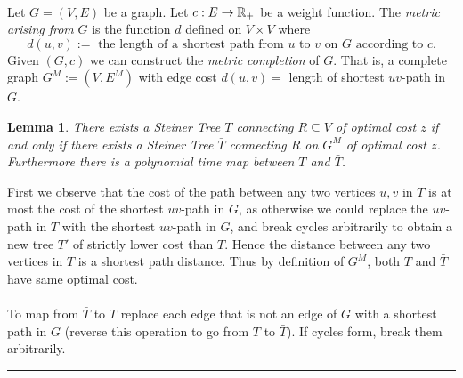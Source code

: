 \documentclass[letterpaper,12pt,oneside,onecolumn]{article}
\newenvironment{proof}{{\bf Proof:  }}{\hfill\rule{2mm}{2mm}}
\newtheorem{lemma}[fact]{Lemma}
\begin{document}
\paragraph{}
Let $G=(V,E)$ be a graph. Let $c : E \rightarrow \mathbb{R}_+$ be a weight function. The {\it metric arising from} $G$ is the function $d$ defined on $V \times V$ where
$$d(u,v) := \text{ the length of a shortest path from } u \text{ to } v \text{ on } G \text{ according to } c.$$ Given $(G,c)$ we can construct the {\it metric completion} of $G$. That is, a complete graph $G^M := (V, E^M)$ with edge cost $d(u,v)  = $ length of shortest $uv$-path in $G$.
\begin{lemma}
There exists a Steiner Tree $T$ connecting $R\subseteq V$ of optimal cost $z$ if and only if there exists a Steiner Tree $\bar{T}$ connecting $R$ on $G^M$ of optimal cost $z$. Furthermore there is a polynomial time map between $T$ and $\bar{T}$.
\end{lemma}
\begin{proof}
First we observe that the cost of the path between any two vertices $u,v$ in $T$ is at most the cost of the shortest $uv$-path in $G$, as otherwise we could replace the $uv$-path in $T$ with the shortest $uv$-path in $G$, and break cycles arbitrarily to obtain a new tree $T'$ of strictly lower cost than $T$. Hence the distance between any two vertices in $T$ is a shortest path distance. Thus by definition of $G^M$, both $T$ and $\bar{T}$ have same optimal cost.
\paragraph{}
To map from $\bar{T}$ to $T$ replace each edge that is not an edge of $G$ with a shortest path in $G$ (reverse this operation to go from $T$ to $\bar{T}$). If cycles form, break them arbitrarily.
\end{proof}
\end{document}
